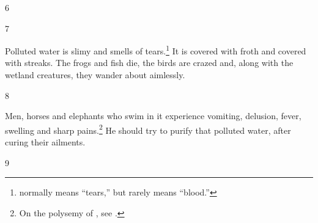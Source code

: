 \begin{translation}

%    
%    
%    
%    

    
    \item [6]
    
    \item[7]
    
    Polluted water is slimy and smells of tears.\footnote{ normally
means “tears,” but rarely means “blood.” }  It is covered with froth and
covered with streaks. The frogs and fish die, the birds are crazed and, along with
the wetland creatures, they wander about aimlessly.
    
     \item [8]
     
     Men, horses and elephants who swim in it experience vomiting, delusion,
fever, swelling and sharp pains.\footnote{On the polysemy of , see \cite{seme-1979}.} 
    He should try to purify that polluted water, after curing their ailments.
     
\item [9]


\end{translation}
